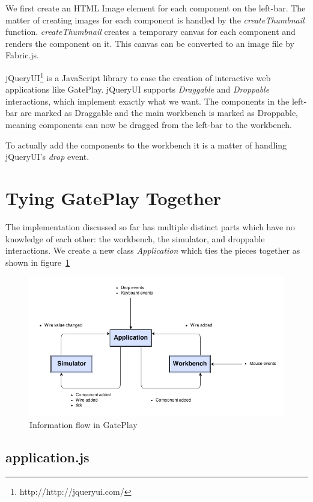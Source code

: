 We first create an HTML Image element for each component on the left-bar. The matter of creating images for each component is handled by the  \textit{createThumbnail} function. \textit{createThumbnail} creates a temporary canvas for each component and renders the component on it. This canvas can be converted to an image file by Fabric.js.

jQueryUI\footnote{http://http://jqueryui.com/} is a JavaScript library to ease the creation of interactive web applications like GatePlay. jQueryUI supports \textit{Draggable} and \textit{Droppable} interactions, which implement exactly what we want. The components in the left-bar are marked as Draggable and the main workbench is marked as Droppable, meaning components can now be dragged from the left-bar to the workbench.

To actually add the components to the workbench it is a matter of handling jQueryUI's \textit{drop} event.

\section{Tying GatePlay Together}
The implementation discussed so far has multiple distinct parts which have no knowledge of each other: the workbench, the simulator, and droppable interactions. We create a new class \textit{Application} which ties the pieces together as shown in figure~\ref{fig:application}

\begin{figure}[p]
    \centering
    \includegraphics[width=\textwidth]{application.png}
    \caption{Information flow in GatePlay}
    \label{fig:application}
\end{figure}


\subsection{application.js}
